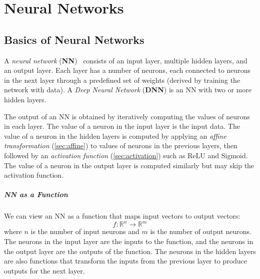 \documentclass[oneside,11pt,dvipsnames]{book}
\numberwithin{equation}{section}
\theoremstyle{definition}
\theoremstyle{remark}
\begin{document}
\chapter{Neural Networks}\label{sec:basic}

\section{Basics of Neural Networks}
A \emph{neural network} (\textbf{NN})~\cite{Goodfellow-et-al-2016} consists of an input layer, multiple hidden layers, and an output layer. Each layer has a number of neurons, each connected to neurons in the next layer through a predefined set of weights (derived by training the network with data). A \emph{Deep Neural Network} (\textbf{DNN}) is an NN with two or more hidden layers. 


The output of an NN is obtained by iteratively computing  the  values  of  neurons  in  each  layer.
The value of a neuron in the input layer is the input data. The value of a neuron in the hidden layers is computed by applying an \emph{affine transformation} (\autoref{sec:affine}) to values of neurons in the previous layers, then followed by an \emph{activation function} (\autoref{sec:activation}) such as ReLU and Sigmoid. The value of a neuron in the output layer is computed similarly but may skip the activation function.

\paragraph{NN as a Function} We can view an NN as a function that maps input vectors to output vectors: 
\begin{equation}
f: \mathbb{R}^{n} \to \mathbb{R}^{m}
\end{equation}
where \(n\) is the number of input neurons and \(m\) is the number of output neurons. The neurons in the input layer are the inputs to the function, and the neurons in the output layer are the outputs of the function. The neurons in the hidden layers are also functions that transform the inputs from the previous layer to produce outputs for the next layer.
\end{document}
